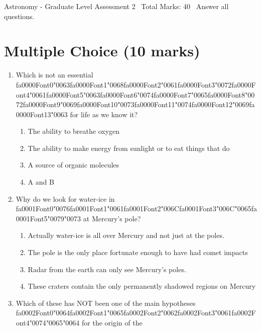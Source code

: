 \documentclass[12pt]{article}
\begin{document}
\begin{center}
Astronomy - Graduate Level Assessment 2 \
Total Marks: 40 \
Answer all questions.
\end{center}

\section*{Multiple Choice (10 marks)}
\begin{enumerate}[label=\arabic*.]
\item Which is not an essential {\csname fa0000Font0\endcsname\char"0063}{\csname fa0000Font1\endcsname\char"0068}{\csname fa0000Font2\endcsname\char"0061}{\csname fa0000Font3\endcsname\char"0072}{\csname fa0000Font4\endcsname\char"0061}{\csname fa0000Font5\endcsname\char"0063}{\csname fa0000Font6\endcsname\char"0074}{\csname fa0000Font7\endcsname\char"0065}{\csname fa0000Font8\endcsname\char"0072}{\csname fa0000Font9\endcsname\char"0069}{\csname fa0000Font10\endcsname\char"0073}{\csname fa0000Font11\endcsname\char"0074}{\csname fa0000Font12\endcsname\char"0069}{\csname fa0000Font13\endcsname\char"0063} for life as we know it?
\begin{enumerate}[label=(\alph*)]
    \item The ability to breathe oxygen
    \item The ability to make energy from sunlight or to eat things that do
    \item A source of organic molecules
    \item A and B
\end{enumerate}
\item Why do we look for water-ice in {\csname fa0001Font0\endcsname\char"0076}{\csname fa0001Font1\endcsname\char"0061}{\csname fa0001Font2\endcsname\char"006C}{\csname fa0001Font3\endcsname\char"006C}{\char"0065}{\csname fa0001Font5\endcsname\char"0079}{\char"0073} at Mercury's pole?
\begin{enumerate}[label=(\alph*)]
    \item Actually water-ice is all over Mercury and not just at the poles.
    \item The pole is the only place fortunate enough to have had comet impacts
    \item Radar from the earth can only see Mercury's poles.
    \item These craters contain the only permanently shadowed regions on Mercury
\end{enumerate}
\item Which of these has NOT been one of the main hypotheses {\csname fa0002Font0\endcsname\char"0064}{\csname fa0002Font1\endcsname\char"0065}{\csname fa0002Font2\endcsname\char"0062}{\csname fa0002Font3\endcsname\char"0061}{\csname fa0002Font4\endcsname\char"0074}{\char"0065}{\char"0064} for the origin of the

\end{enumerate}
\end{document}
